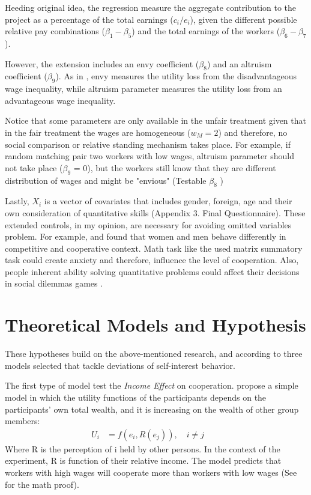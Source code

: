 \documentclass[a4paper, 12pt]{article}
\begin{document}
Heeding \cite{SPRAGGON2009} original idea, the regression measure the aggregate contribution to the project as a percentage of the total earnings ($c_i/e_i$), given the different possible relative pay combinations ($\beta_1 - \beta_5$) and the total earnings of the workers ($\beta_6 - \beta_7$). 

However, the extension includes an envy coefficient ($\beta_8$) and an altruism coefficient ($\beta_9$). As in \cite{Fehr1999}, envy measures the utility loss from the disadvantageous wage inequality, while altruism parameter measures the utility loss from an advantageous wage inequality. 

Notice that some parameters are only available in the unfair treatment given that in the fair treatment the wages are homogeneous ($w_M=2$) and therefore, no social comparison or relative standing mechanism takes place. For example, if random matching pair two workers with low wages, altruism parameter should not take place ($\beta_9$ = 0), but the workers still know that they are different distribution of wages and might be "envious" (Testable $\beta_8$ )

Lastly, ${X_i}$ is a vector of covariates that includes gender, foreign, age and their own consideration of quantitative skills (Appendix 3. Final Questionnaire). These extended controls, in my opinion, are necessary for avoiding omitted variables problem. For example, \cite{Gneezy2003} and \cite{Bracha2012} found that women and men behave differently in competitive and cooperative context. Math task like the used matrix summatory task could create anxiety \citep{Ashcraft2001, Keogh2001} and therefore, influence the level of cooperation. Also, people inherent ability solving quantitative problems could affect their decisions in social dilemmas games \citep{Lezzi2015}. 

\section{Theoretical Models and Hypothesis}

These hypotheses build on the above-mentioned research, and according to three models selected that tackle deviations of self-interest behavior. 

The first type of model test the \textit{Income Effect} on cooperation. \cite{Becker1974} propose a simple model in which the utility functions of the participants depends on the participants’ own total wealth, and it is increasing on the wealth of other group members:
\begin{equation}
\begin{aligned}
U_i &= f(e_i, R(e_j)), \quad i\neq j \quad \quad
\end{aligned}
\end{equation}
Where R is the perception of i held by other persons. In the context of the experiment, R is function of their relative income. The model predicts that workers with high wages will cooperate more than workers with low wages (See \cite{BUCKLEY2006} for the math proof). \\
\end{document}

